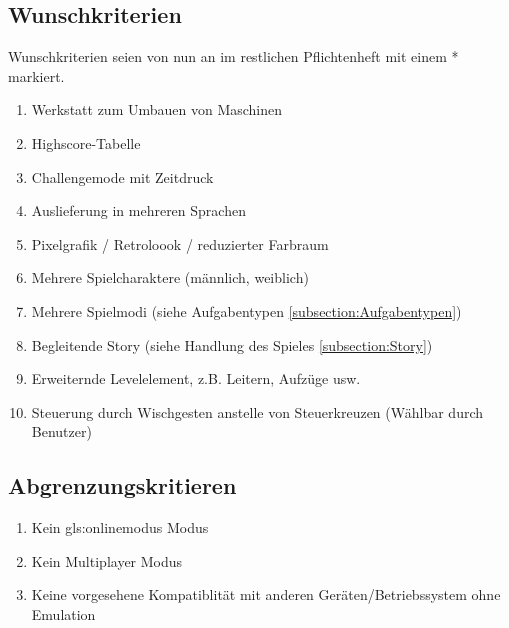 \documentclass{scrartcl}
\begin{document}
\subsection{Wunschkriterien}
Wunschkriterien seien von nun an im restlichen Pflichtenheft mit einem * markiert.

\begin{enumerate}
	\item \label{wunsch:werkstatt}Werkstatt zum Umbauen von Maschinen
	\item \label{wunsch:highscore}Highscore-Tabelle
	\item \label{wunsch:challengemode}Challengemode mit Zeitdruck
	\item \label{wunsch:multilang}Auslieferung in mehreren Sprachen
	\item \label{wunsch:8bit}Pixelgrafik / Retroloook / reduzierter Farbraum
	\item \label{wunsch:multiplechar}Mehrere Spielcharaktere (männlich, weiblich)
	\item \label{wunsch:multiplemode}Mehrere Spielmodi (siehe Aufgabentypen \ref{subsection:Aufgabentypen})
    \item \label{wunsch:story}Begleitende Story (siehe Handlung des Spieles \ref{subsection:Story})
    \item \label{wunsch:erweiterndeLevelelemente}Erweiternde Levelelement, z.B. Leitern, Aufzüge usw.
    \item \label{wunsch:wischgesten} Steuerung durch Wischgesten anstelle von Steuerkreuzen (Wählbar durch Benutzer)
\end{enumerate}

\subsection{Abgrenzungskritieren}

\begin{enumerate}
	\item \label{abgrenz:online}Kein \gls{gls:onlinemodus} Modus
	\item \label{abgrenz:multiplayer}Kein Multiplayer Modus
	\item \label{abgrenz:emu}Keine vorgesehene Kompatiblität mit anderen Geräten/Betriebssystem ohne Emulation
\end{enumerate}

\clearpage
\end{document}

